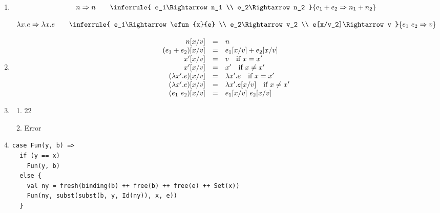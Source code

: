 \textbf{}
\newcommand{\evals}[2]{#1\Rightarrow#2}
\begin{enumerate}
  \item
      \[
        \evals{n}{n}
        \qquad
        \inferrule
        { \evals{e_1}{n_1} \\ \evals{e_2}{n_2} }
        { \evals{\eadd{e_1}{e_2}}{\eadd{n_1}{n_2}} }
      \]

      \[
        \evals{\efun{x}{e}}{\efun{x}{e}}
        \qquad
        \inferrule
        { \evals{e_1}{\efun{x}{e}} \\
          \evals{e_2}{v_2} \\
          \evals{e[x/v_2]}{v} }
        { \evals{\eapp{e_1}{e_2}}{v} }
      \]
  \item
      \[
        \begin{array}{rcl}
          n[x/v] &=& n \\
          (\eadd{e_1}{e_2})[x/v] &=& \eadd{e_1[x/v]}{e_2[x/v]} \\
          x'[x/v] &=& v \quad \text{if}\ x=x' \\
          x'[x/v] &=& x' \quad \text{if}\ x\not=x' \\
          (\efun{x'}{e})[x/v] &=& \efun{x'}{e} \quad \text{if}\ x=x' \\
          (\efun{x'}{e})[x/v] &=& \efun{x'}{e[x/v]} \quad \text{if}\ x\not=x' \\
          (\eapp{e_1}{e_2})[x/v] &=& \eapp{e_1[x/v]}{e_2[x/v]} \\
        \end{array}
      \]
  \item
    \begin{enumerate}
        \item 22
        \item Error
    \end{enumerate}
  \item
\begin{verbatim}
case Fun(y, b) =>
  if (y == x)
    Fun(y, b)
  else {
    val ny = fresh(binding(b) ++ free(b) ++ free(e) ++ Set(x))
    Fun(ny, subst(subst(b, y, Id(ny)), x, e))
  }
\end{verbatim}
\end{enumerate}

